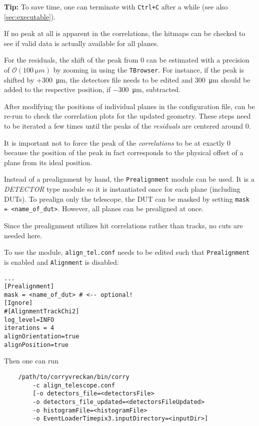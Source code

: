 \textbf{Tip:} To save time, one can terminate \corry with \texttt{Ctrl+C} after a while (see also \ref{sec:executable}).

If no peak at all is apparent in the correlations, the hitmaps can be checked to see if valid data is actually available for all planes.

For the residuals, the shift of the peak from 0 can be estimated with a precision of $\mathcal{O}(\SI{100}{\micro m})$ by zooming in using the \texttt{TBrowser}.
For instance, if the peak is shifted by +\SI{+300}{\micro m}, the detectors file needs to be edited and \SI{+300}{\micro m} should be added to the respective position, if \SI{-300}{\micro m}, subtracted.

After modifying the positions of individual planes in the configuration file, \corry can be re-run to check the correlation plots for the updated geometry.
These steps need to be iterated a few times until the peaks of the \textit{residuals} are centered around 0.
 
It is important not to force the peak of the \textit{correlations} to be at exactly 0 because the position of the peak in fact corresponds to the physical offset of a plane from its ideal position. 

Instead of a prealignment by hand, the \texttt{Prealignment} module can be used.
It is a \textit{DETECTOR} type module so it is instantiated once for each plane (including DUTs).
To prealign only the telescope, the DUT can be masked by setting \texttt{mask = <name\_of\_dut>}.
However, all planes can be prealigned at once.

Since the prealignment utilizes hit correlations rather than tracks, no cuts are needed here.

To use the module, \texttt{align\_tel.conf} needs to be edited such that \texttt{Prealignment} is enabled and \texttt{Alignment} is disabled:
\begin{verbatim}
...
[Prealignment]
mask = <name_of_dut> # <-- optional!
[Ignore]
#[AlignmentTrackChi2]
log_level=INFO
iterations = 4
alignOrientation=true
alignPosition=true
\end{verbatim}

Then one can run
\begin{verbatim}
    /path/to/corryvreckan/bin/corry 
        -c align_telescope.conf
    	[-o detectors_file=<detectorsFile> 
    	-o detectors_file_updated=<detectorsFileUpdated> 
    	-o histogramFile=<histogramFile> 
    	-o EventLoaderTimepix3.inputDirectory=<inputDir>]
\end{verbatim}

